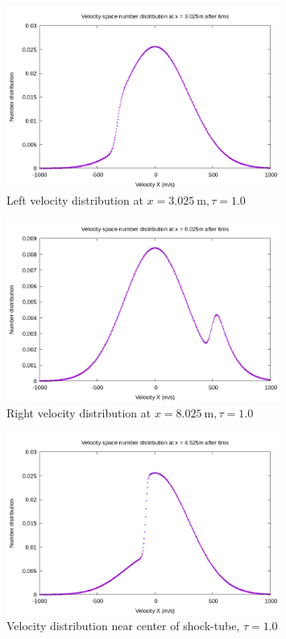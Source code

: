 \documentclass[paper=a4, fontsize=12pt]{scrartcl}
\begin{document}
\begin{figure}[H]
        \centering
        \includegraphics[width=0.8\textwidth]{left_f-t}
        \caption{Left velocity distribution at $x = \SI{3.025}{\meter}, \tau = 1.0$ }
        \label{fig:left_f-t}
\end{figure}
\begin{figure}[H]
        \centering
        \includegraphics[width=0.8\textwidth]{right_f-t}
        \caption{Right velocity distribution at $x = \SI{8.025}{\meter}, \tau = 1.0$ }
        \label{fig:right_f-t}
\end{figure}
\begin{figure}[H]
        \centering
        \includegraphics[width=0.8\textwidth]{center_shock-t}
        \caption{Velocity distribution near center of shock-tube, $\tau = 1.0$}
        \label{fig:center_shock-t}
\end{figure}
\end{document}
